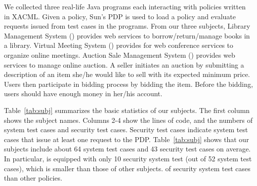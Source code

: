 We collected three real-life Java programs \cite{mouelhi09:tranforming} each
interacting with policies written in XACML.
Given a policy, 
Sun's PDP \cite{sun05:xacml} is
used to load a policy and evaluate requests issued from test cases in the programs.
From our three subjects,
Library Management System () provides web services to borrow/return/manage books in a library.
Virtual Meeting System () provides for web conference services to organize online meetings.
Auction Sale Management System () provides web services to manage online auction.
A seller initiates an auction by submitting a description of an item she/he would like to sell with its expected minimum price. Users then participate in bidding process by
bidding the item. Before the bidding, users should have enough money in her/his account.


Table~\ref{tab:subj} summarizes the basic statistics of our subjects.
The first column shows the subject names.
Columns 2-4 show the lines of code, and the numbers of system test cases and security test cases.
Security test cases indicate system test cases that issue at least one request to the PDP.
Table~\ref{tab:subj} shows that our subjects include about 64 system test cases and 43 security
test cases on average.
In particular,  is equipped with only 10 security system test (out of 52 system test cases), which
is smaller than those of other subjects.
of security system test cases than other policies.


